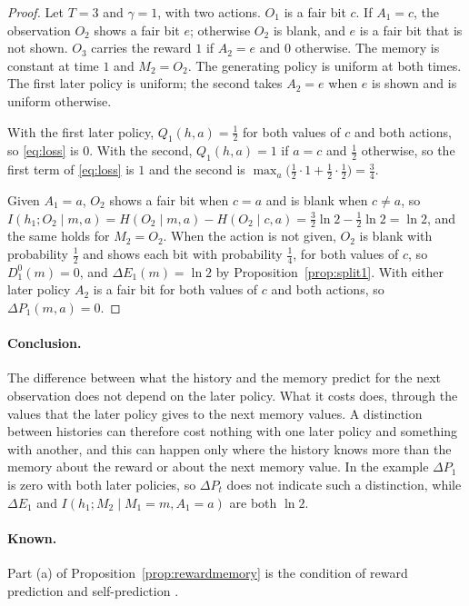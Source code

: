 \documentclass{article}
\theoremstyle{definition}
\numberwithin{equation}{section}
\newcommand{\dE}{\Delta E}
\newcommand{\dP}{\Delta P}
\begin{document}
\begin{proof}
Let $T=3$ and $\gamma=1$, with two actions. $O_1$ is a fair bit $c$. If $A_1=c$, the observation $O_2$ shows a fair bit $e$; otherwise $O_2$ is blank, and $e$ is a fair bit that is not shown. $O_3$ carries the reward $1$ if $A_2=e$ and $0$ otherwise. The memory is constant at time $1$ and $M_2=O_2$. The generating policy is uniform at both times. The first later policy is uniform; the second takes $A_2=e$ when $e$ is shown and is uniform otherwise.

With the first later policy, $Q_1(h,a)=\tfrac12$ for both values of $c$ and both actions, so \eqref{eq:loss} is $0$. With the second, $Q_1(h,a)=1$ if $a=c$ and $\tfrac12$ otherwise, so the first term of \eqref{eq:loss} is $1$ and the second is $\max_a\big(\tfrac12\cdot1+\tfrac12\cdot\tfrac12\big)=\tfrac34$.

Given $A_1=a$, $O_2$ shows a fair bit when $c=a$ and is blank when $c\ne a$, so $I(h_1;O_2\mid m,a)=H(O_2\mid m,a)-H(O_2\mid c,a)=\tfrac32\ln2-\tfrac12\ln2=\ln2$, and the same holds for $M_2=O_2$. When the action is not given, $O_2$ is blank with probability $\tfrac12$ and shows each bit with probability $\tfrac14$, for both values of $c$, so $D^0_1(m)=0$, and $\dE_1(m)=\ln2$ by Proposition~\ref{prop:split1}. With either later policy $A_2$ is a fair bit for both values of $c$ and both actions, so $\dP_1(m,a)=0$.
\end{proof}

\paragraph{Conclusion.} The difference between what the history and the memory predict for the next observation does not depend on the later policy. What it costs does, through the values that the later policy gives to the next memory values. A distinction between histories can therefore cost nothing with one later policy and something with another, and this can happen only where the history knows more than the memory about the reward or about the next memory value. In the example $\dP_1$ is zero with both later policies, so $\dP_t$ does not indicate such a distinction, while $\dE_1$ and $I(h_1;M_2\mid M_1=m,A_1=a)$ are both $\ln2$.

\paragraph{Known.} Part (a) of Proposition~\ref{prop:rewardmemory} is the condition of reward prediction and self-prediction \citep{subramanian2022approximate,ni2024bridging}.
\end{document}
